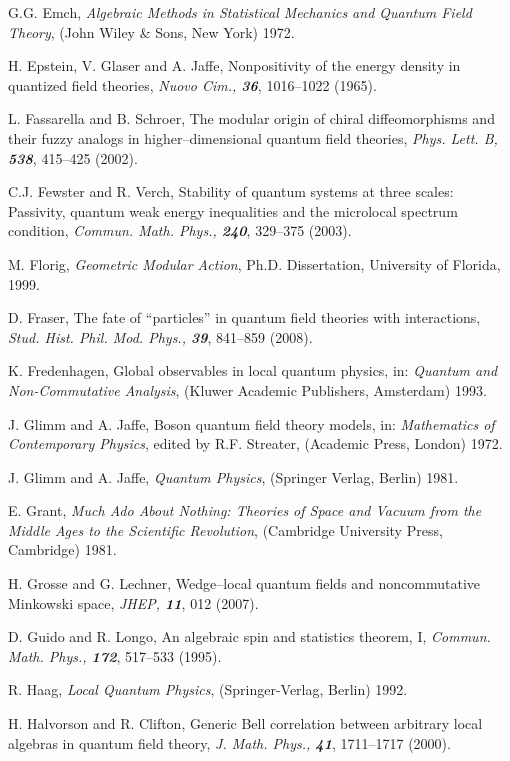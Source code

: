 \documentclass[12pt]{article}
\begin{document}
\begin{thebibliography}{Bor}
G.G. Emch, {\it Algebraic Methods in Statistical Mechanics and
Quantum Field Theory}, (John Wiley \& Sons, New York) 1972.

H. Epstein, V. Glaser and A. Jaffe, Nonpositivity of the energy density
in quantized field theories, {\sl Nuovo Cim., \bf 36}, 1016--1022 (1965).

L. Fassarella and B. Schroer, The modular origin of chiral 
diffeomorphisms and their fuzzy analogs in higher--dimensional
quantum field theories, {\sl Phys. Lett. B, \bf 538}, 415--425 (2002). 

C.J. Fewster and R. Verch, Stability of quantum systems at three
scales: Passivity, quantum weak energy inequalities and the microlocal
spectrum condition, {\sl Commun. Math. Phys., \bf 240}, 329--375 (2003).

M. Florig, {\it Geometric Modular Action}, Ph.D. Dissertation, 
University of Florida, 1999.

D. Fraser, The fate of ``particles'' in quantum field theories with
interactions, {\sl Stud. Hist. Phil. Mod. Phys., \bf 39}, 841--859 (2008).

K. Fredenhagen, Global observables in local quantum physics, in:
{\it Quantum and Non-Commutative Analysis}, (Kluwer Academic Publishers, 
Amsterdam) 1993.

J. Glimm and A. Jaffe, Boson quantum field theory models, in:
{\it Mathematics of Contemporary Physics}, edited by R.F. Streater, 
(Academic Press, London) 1972.

J. Glimm and A. Jaffe, {\it Quantum Physics}, (Springer Verlag, Berlin)
1981.

E. Grant, {\it Much Ado About Nothing: Theories of Space
and Vacuum from the Middle Ages to the Scientific Revolution},
(Cambridge University Press, Cambridge) 1981.

H. Grosse and G. Lechner, Wedge--local quantum fields and
noncommutative Minkowski space, {\sl JHEP, \bf 11}, 012 (2007).

D. Guido and R. Longo, An algebraic spin and statistics theorem, I,
{\sl Commun. Math. Phys., \bf 172}, 517--533 (1995).

R. Haag, {\it Local Quantum Physics}, (Springer-Verlag, Berlin) 1992. 

H. Halvorson and R. Clifton, Generic Bell correlation between arbitrary
local algebras in quantum field theory, {\sl J. Math. Phys., \bf 41}, 
1711--1717 (2000).


\end{thebibliography}
\end{document}
